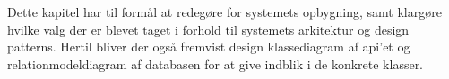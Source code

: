 Dette kapitel har til formål at redegøre for systemets opbygning, samt klargøre hvilke valg 
der er blevet taget i forhold til systemets arkitektur og design patterns. Hertil bliver der også fremvist 
design klassediagram af api'et og relationmodeldiagram af databasen for at give indblik i de konkrete klasser.